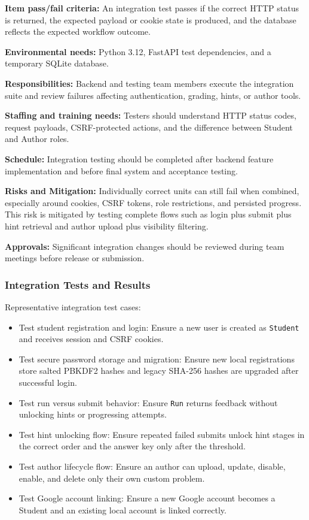 \textbf{Item pass/fail criteria:}
An integration test passes if the correct HTTP status is returned, the expected payload or cookie state is produced, and the database reflects the expected workflow outcome.

\textbf{Environmental needs:}
Python 3.12, FastAPI test dependencies, and a temporary SQLite database.

\textbf{Responsibilities:}
Backend and testing team members execute the integration suite and review failures affecting authentication, grading, hints, or author tools.

\textbf{Staffing and training needs:}
Testers should understand HTTP status codes, request payloads, CSRF-protected actions, and the difference between Student and Author roles.

\textbf{Schedule:}
Integration testing should be completed after backend feature implementation and before final system and acceptance testing.

\textbf{Risks and Mitigation:}
Individually correct units can still fail when combined, especially around cookies, CSRF tokens, role restrictions, and persisted progress. This risk is mitigated by testing complete flows such as login plus submit plus hint retrieval and author upload plus visibility filtering.

\textbf{Approvals:}
Significant integration changes should be reviewed during team meetings before release or submission.

\subsubsection{Integration Tests and Results}
Representative integration test cases:
\begin{itemize}
    \item Test student registration and login: Ensure a new user is created as \texttt{Student} and receives session and CSRF cookies.
    \item Test secure password storage and migration: Ensure new local registrations store salted PBKDF2 hashes and legacy SHA-256 hashes are upgraded after successful login.
    \item Test run versus submit behavior: Ensure \texttt{Run} returns feedback without unlocking hints or progressing attempts.
    \item Test hint unlocking flow: Ensure repeated failed submits unlock hint stages in the correct order and the answer key only after the threshold.
    \item Test author lifecycle flow: Ensure an author can upload, update, disable, enable, and delete only their own custom problem.
    \item Test Google account linking: Ensure a new Google account becomes a Student and an existing local account is linked correctly.
\end{itemize}

